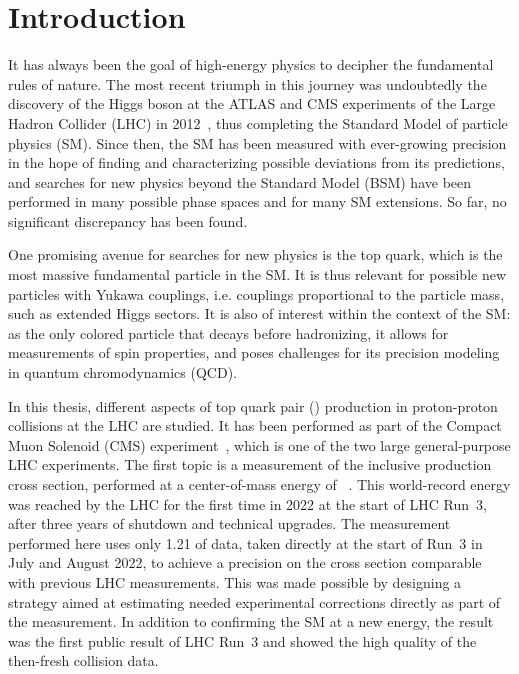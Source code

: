 \chapter{Introduction}
\label{ch:intro}


It has always been the goal of high-energy physics to decipher the fundamental rules of nature. The most recent triumph in this journey was undoubtedly the discovery of the Higgs boson at the ATLAS and CMS experiments of the Large Hadron Collider (LHC) in 2012~\cite{ATLAS:2012tfa,CMS:HIG-12-028,CMS:HIG-12-036}, thus completing the Standard Model of particle physics (SM). Since then, the SM has been measured with ever-growing precision in the hope of finding and characterizing possible deviations from its predictions, and searches for new physics beyond the Standard Model (BSM) have been performed in many possible phase spaces and for many SM extensions. So far, no significant discrepancy has been found.

One promising avenue for searches for new physics is the top quark, which is the most massive fundamental particle in the SM. It is thus relevant for possible new particles with Yukawa couplings, i.e. couplings proportional to the particle mass, such as extended Higgs sectors. It is also of interest within the context of the SM: as the only colored particle that decays before hadronizing, it allows for measurements of spin properties, and poses challenges for its precision modeling in quantum chromodynamics (QCD). 

\medskip

In this thesis, different aspects of top quark pair (\ttbar) production in proton-proton collisions at the LHC are studied. It has been performed as part of the Compact Muon Solenoid (CMS) experiment~\cite{CMS:2008xjf}, which is one of the two large general-purpose LHC experiments. The first topic is a measurement of the inclusive \ttbar production cross section, performed at a center-of-mass energy of \sqrtsRIII~\cite{CMS:TOP-22-012}. This world-record energy was reached by the LHC for the first time in 2022 at the start of LHC Run~3, after three years of shutdown and technical upgrades. The measurement performed here uses only \SI{1.21}{\fbinv} of data, taken directly at the start of Run~3 in July and August 2022, to achieve a precision on the \ttbar cross section comparable with previous LHC measurements. This was made possible by designing a strategy aimed at estimating needed experimental corrections directly as part of the measurement. In addition to confirming the SM at a new energy, the result was the first public result of LHC Run~3 and showed the high quality of the then-fresh collision data.

